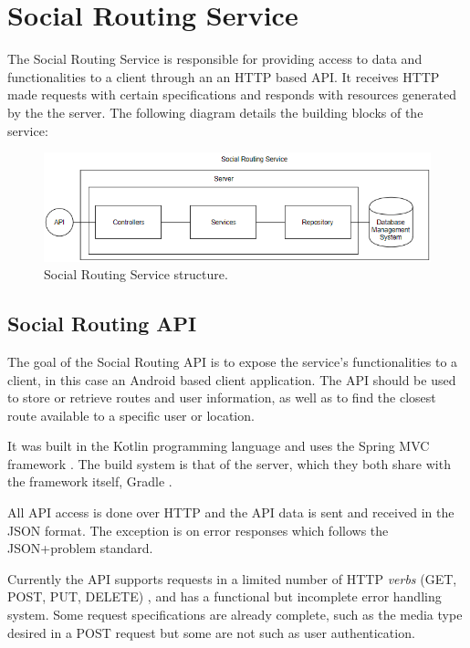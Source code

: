 \documentclass{article}
\begin{document}
        \newpage

    \section{Social Routing Service}

        The Social Routing Service is responsible for providing access to data and functionalities to a client through an an HTTP based API. It receives HTTP made requests
        with certain specifications and responds with resources generated by the the server. The following diagram details the building blocks of the service:

        \begin{figure}[h]            
            \includegraphics[width=\textwidth]{images/project-structure/service-structure.PNG}
            \caption{Social Routing Service structure.}
        \end{figure}  

        \subsection{Social Routing API}          
           
            The goal of the Social Routing API is to expose the service's functionalities to a client, in this case an Android\cite{androiddocs} based client application. The API
            should be used to store or retrieve routes and user information, as well as to find the closest route available to a specific user or location.\par
            It was built in the Kotlin programming language and uses the {Spring MVC framework} \cite{springwebsite}. The build system is that of the server,
            which they both share with the framework itself, Gradle \cite{gradlewebsite}. \par 
            All API access is done over HTTP and the API data is sent and received in the JSON \cite{jsonwebsite} format. The exception is on error responses
            which follows the JSON+problem \cite{jsonproblemonlinedocs} standard. \par
            Currently the API supports requests in a limited number of HTTP \textit{verbs} (GET, POST, PUT, DELETE) \cite{apihttpverbsdocs}, and has a functional but incomplete error handling system. 
            Some request specifications are already complete, such as the media type desired in a POST request but some are not such as user authentication. 
\end{document}

